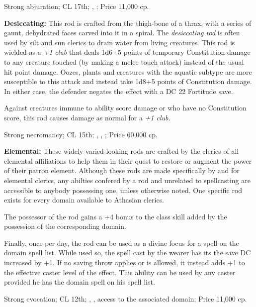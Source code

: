 Strong abjuration; CL 17th; , ; Price 11,000 cp.

\textbf{Desiccating:} This rod is crafted from the thigh-bone of a thrax, with a series of gaunt, dehydrated faces carved into it in a spiral. The \emph{desiccating rod} is often used by silt and sun clerics to drain water from living creatures. This rod is wielded as a \emph{+1 club} that deals 1d6+5 points of temporary Constitution damage to any creature touched (by making a melee touch attack) instead of the usual hit point damage. Oozes, plants and creatures with the aquatic subtype are more susceptible to this attack and instead take 1d8+5 points of Constitution damage. In either case, the defender negates the effect with a DC 22 Fortitude save.

Against creatures immune to ability score damage or who have no Constitution score, this rod causes damage as normal for a \emph{+1 club}.

Strong necromancy; CL 15th; , , ; Price 60,000 cp.

\textbf{Elemental:} These widely varied looking rods are crafted by the clerics of all elemental affiliations to help them in their quest to restore or augment the power of their patron element. Although these rods are made specifically by and for elemental clerics, any abilties confered by a rod and unrelated to spellcasting are accessible to anybody possessing one, unless otherwise noted. One specific rod exists for every domain available to Athasian clerics.

The possessor of the rod gains a +4 bonus to the class skill added by the possession of the corresponding domain.


Finally, once per day, the rod can be used as a divine focus for a spell on the domain spell list. While used so, the spell cast by the wearer has its the save DC increased by +1. If no saving throw applies or is allowed, it instead adds +1 to the effective caster level of the effect. This ability can be used by any caster provided he has the domain spell on his spell list.

Strong evocation; CL 12th; , , access to the associated domain; Price 11,000 cp.


